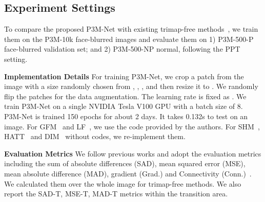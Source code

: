 \documentclass[sigconf]{acmart}
\begin{document}
\subsection{Experiment Settings}
To compare the proposed P3M-Net with existing trimap-free methods~\cite{shm,lf,hatt,gfm}, we train them on the P3M-10k face-blurred images and evaluate them on 1) P3M-500-P face-blurred validation set; and 2) P3M-500-NP normal, following the PPT setting.

\noindent\textbf{Implementation Details}
For training P3M-Net, we crop a patch from the image with a size randomly chosen from , , , and then resize it to . We randomly flip the patches for the data augmentation. The learning rate is fixed as . We train P3M-Net on a single NVIDIA Tesla V100 GPU with a batch size of 8. P3M-Net is trained 150 epochs for about 2 days. It takes 0.132s to test on an  image. For GFM~\cite{gfm} and LF~\cite{lf}, we use the code provided by the authors. For SHM~\cite{shm}, HATT~\cite{hatt} and DIM~\cite{dim} without codes, we re-implement them.

\noindent\textbf{Evaluation Metrics} We follow previous works and adopt the evaluation metrics including the sum of absolute differences (SAD), mean squared error (MSE), mean absolute difference (MAD), gradient (Grad.) and Connectivity (Conn.)~\cite{rhemann2009perceptually}. We calculated them over the whole image for trimap-free methods. We also report the SAD-T, MSE-T, MAD-T metrics within the transition area.
\end{document}
